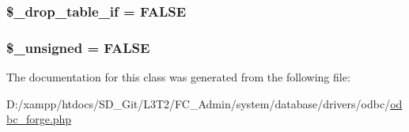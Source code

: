 \subsubsection[{\$\+\_\+drop\+\_\+table\+\_\+if}]{\setlength{\rightskip}{0pt plus 5cm}\$\+\_\+drop\+\_\+table\+\_\+if = F\+A\+L\+S\+E\hspace{0.3cm}{\ttfamily [protected]}}\label{class_c_i___d_b__odbc__forge_a92a8a9145a7fc91e252e58d019373581}
\hypertarget{class_c_i___d_b__odbc__forge_aae977ae6d61fa183f0b25422b6ddc31c}{}
\subsubsection[{\$\+\_\+unsigned}]{\setlength{\rightskip}{0pt plus 5cm}\$\+\_\+unsigned = F\+A\+L\+S\+E\hspace{0.3cm}{\ttfamily [protected]}}\label{class_c_i___d_b__odbc__forge_aae977ae6d61fa183f0b25422b6ddc31c}


The documentation for this class was generated from the following file\+:\begin{DoxyCompactItemize}
\item 
D\+:/xampp/htdocs/\+S\+D\+\_\+\+Git/\+L3\+T2/\+F\+C\+\_\+\+Admin/system/database/drivers/odbc/\hyperlink{odbc__forge_8php}{odbc\+\_\+forge.\+php}\end{DoxyCompactItemize}
